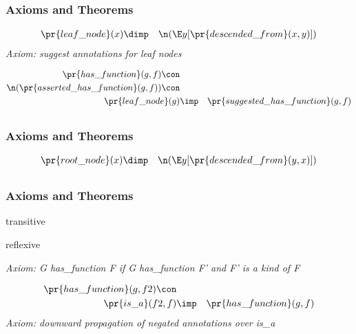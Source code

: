 \subsection*{ }
\subsubsection*{Axioms and Theorems}

\begin{eqnarray*}
 \pr{leaf\_node}(x) &\dimp & \n( \E y[ \pr{descended\_from}(x, y) ])
\end{eqnarray*}
\emph{Axiom: suggest annotations for leaf nodes}

\begin{eqnarray*}
 \pr{has\_function}(g, f) \con \\
 \n( \pr{asserted\_has\_function}(g, f) )\con \\
 \pr{leaf\_node}(g) &\imp & \pr{suggested\_has\_function}(g, f) 
\end{eqnarray*}
\subsection*{ }
\subsubsection*{Axioms and Theorems}

\begin{eqnarray*}
 \pr{root\_node}(x) &\dimp & \n( \E y[ \pr{descended\_from}(y, x) ])
\end{eqnarray*}
\subsection*{ }
\subsubsection*{Axioms and Theorems}
\begin{clist}
\item transitive
\item reflexive
\end{clist}

\emph{Axiom: G has\_function F if G has\_function F' and F' is a kind of F}

\begin{eqnarray*}
 \pr{has\_function}(g, f2) \con \\
 \pr{is\_a}(f2, f) &\imp & \pr{has\_function}(g, f) 
\end{eqnarray*}
\emph{Axiom: downward propagation of negated annotations over is\_a}

